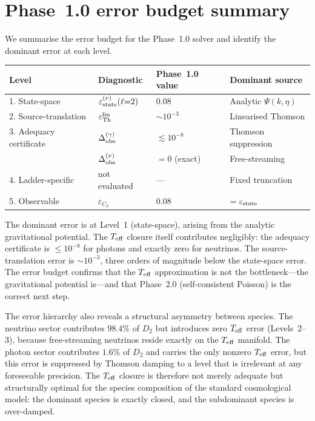 \section{Phase~1.0 error budget summary}
\label{sec:err-phase10-budget}

We summarise the error budget for the Phase~1.0 solver
and identify the dominant error at each level.

\begin{center}
\setlength{\tabcolsep}{5pt}
\begin{tabular}{llll}
\hline\hline
Level & Diagnostic & Phase~1.0 value & Dominant source \\
\hline
1. State-space
  & $\varepsilon_{\rm state}^{(\nu)}(\ell{=}2)$
  & $0.08$
  & Analytic $\Psi(k,\eta)$ \\[3pt]
2. Source-translation
  & $\varepsilon_{\rm Th}^{\rm lin}$
  & $\sim 10^{-3}$
  & Linearised Thomson \\[3pt]
3. Adequacy certificate
  & $\Delta_{\rm obs}^{(\gamma)}$
  & $\lesssim 10^{-8}$
  & Thomson suppression \\[3pt]
  & $\Delta_{\rm obs}^{(\nu)}$
  & $= 0$ (exact)
  & Free-streaming \\[3pt]
4. Ladder-specific
  & not evaluated
  & ---
  & Fixed truncation \\[3pt]
5. Observable
  & $\varepsilon_{C_2}$
  & $0.08$
  & $= \varepsilon_{\rm state}$ \\
\hline\hline
\end{tabular}
\end{center}

The dominant error is at Level~1 (state-space), arising
from the analytic gravitational potential.  The $T_{\mathrm{eff}}$
closure itself contributes negligibly: the adequacy
certificate is $\leq 10^{-8}$ for photons and exactly
zero for neutrinos.  The source-translation error is
$\sim 10^{-3}$, three orders of magnitude below the
state-space error.  The error budget confirms that the
$T_{\mathrm{eff}}$ approximation is not the bottleneck---the
gravitational potential is---and that Phase~2.0
(self-consistent Poisson) is the correct next step.

The error hierarchy also reveals a structural asymmetry
between species.  The neutrino sector contributes
$98.4\%$ of $D_2$ but introduces zero $T_{\mathrm{eff}}$ error
(Levels~2--3), because free-streaming neutrinos reside
exactly on the $T_{\mathrm{eff}}$ manifold.  The photon sector
contributes $1.6\%$ of $D_2$ and carries the only
nonzero $T_{\mathrm{eff}}$ error, but this error is suppressed by
Thomson damping to a level that is irrelevant at any
foreseeable precision.  The $T_{\mathrm{eff}}$ closure is therefore
not merely adequate but structurally optimal for the
species composition of the standard cosmological model:
the dominant species is exactly closed, and the
subdominant species is over-damped.

